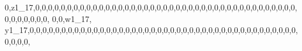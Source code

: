 \documentclass[]{article}
\newenvironment{Shaded}{\begin{snugshade}}{\end{snugshade}}
\newcommand{\DecValTok}[1]{\textcolor[rgb]{0.00,0.00,0.81}{#1}}
\newcommand{\NormalTok}[1]{#1}
\begin{document}
\begin{Shaded}
\begin{Highlighting}[]
\DecValTok{0}\NormalTok{,z1_}\DecValTok{17}\NormalTok{,}\DecValTok{0}\NormalTok{,}\DecValTok{0}\NormalTok{,}\DecValTok{0}\NormalTok{,}\DecValTok{0}\NormalTok{,}\DecValTok{0}\NormalTok{,}\DecValTok{0}\NormalTok{,}\DecValTok{0}\NormalTok{,}\DecValTok{0}\NormalTok{,}\DecValTok{0}\NormalTok{,}\DecValTok{0}\NormalTok{,}\DecValTok{0}\NormalTok{,}\DecValTok{0}\NormalTok{,}\DecValTok{0}\NormalTok{,}\DecValTok{0}\NormalTok{,}\DecValTok{0}\NormalTok{,}\DecValTok{0}\NormalTok{,}\DecValTok{0}\NormalTok{,}\DecValTok{0}\NormalTok{,}\DecValTok{0}\NormalTok{,}\DecValTok{0}\NormalTok{,}\DecValTok{0}\NormalTok{,}\DecValTok{0}\NormalTok{,}\DecValTok{0}\NormalTok{,}\DecValTok{0}\NormalTok{,}\DecValTok{0}\NormalTok{,}\DecValTok{0}\NormalTok{,}\DecValTok{0}\NormalTok{,}\DecValTok{0}\NormalTok{,}\DecValTok{0}\NormalTok{,}\DecValTok{0}\NormalTok{,}\DecValTok{0}\NormalTok{,}\DecValTok{0}\NormalTok{,}\DecValTok{0}\NormalTok{,}\DecValTok{0}\NormalTok{,}\DecValTok{0}\NormalTok{,}\DecValTok{0}\NormalTok{,}\DecValTok{0}\NormalTok{,}\DecValTok{0}\NormalTok{,}\DecValTok{0}\NormalTok{,}\DecValTok{0}\NormalTok{,}\DecValTok{0}\NormalTok{,}\DecValTok{0}\NormalTok{,}\DecValTok{0}\NormalTok{,}\DecValTok{0}\NormalTok{,}\DecValTok{0}\NormalTok{,}\DecValTok{0}\NormalTok{,}\DecValTok{0}\NormalTok{,}\DecValTok{0}\NormalTok{,}
\DecValTok{0}\NormalTok{,}\DecValTok{0}\NormalTok{,w1_}\DecValTok{17}\NormalTok{, y1_}\DecValTok{17}\NormalTok{,}\DecValTok{0}\NormalTok{,}\DecValTok{0}\NormalTok{,}\DecValTok{0}\NormalTok{,}\DecValTok{0}\NormalTok{,}\DecValTok{0}\NormalTok{,}\DecValTok{0}\NormalTok{,}\DecValTok{0}\NormalTok{,}\DecValTok{0}\NormalTok{,}\DecValTok{0}\NormalTok{,}\DecValTok{0}\NormalTok{,}\DecValTok{0}\NormalTok{,}\DecValTok{0}\NormalTok{,}\DecValTok{0}\NormalTok{,}\DecValTok{0}\NormalTok{,}\DecValTok{0}\NormalTok{,}\DecValTok{0}\NormalTok{,}\DecValTok{0}\NormalTok{,}\DecValTok{0}\NormalTok{,}\DecValTok{0}\NormalTok{,}\DecValTok{0}\NormalTok{,}\DecValTok{0}\NormalTok{,}\DecValTok{0}\NormalTok{,}\DecValTok{0}\NormalTok{,}\DecValTok{0}\NormalTok{,}\DecValTok{0}\NormalTok{,}\DecValTok{0}\NormalTok{,}\DecValTok{0}\NormalTok{,}\DecValTok{0}\NormalTok{,}\DecValTok{0}\NormalTok{,}\DecValTok{0}\NormalTok{,}\DecValTok{0}\NormalTok{,}\DecValTok{0}\NormalTok{,}\DecValTok{0}\NormalTok{,}\DecValTok{0}\NormalTok{,}\DecValTok{0}\NormalTok{,}\DecValTok{0}\NormalTok{,}\DecValTok{0}\NormalTok{,}\DecValTok{0}\NormalTok{,}\DecValTok{0}\NormalTok{,}\DecValTok{0}\NormalTok{,}\DecValTok{0}\NormalTok{,}\DecValTok{0}\NormalTok{,}\DecValTok{0}\NormalTok{,}\DecValTok{0}\NormalTok{,}\DecValTok{0}\NormalTok{,}\DecValTok{0}\NormalTok{,}

\end{Highlighting}
\end{Shaded}
\end{document}
